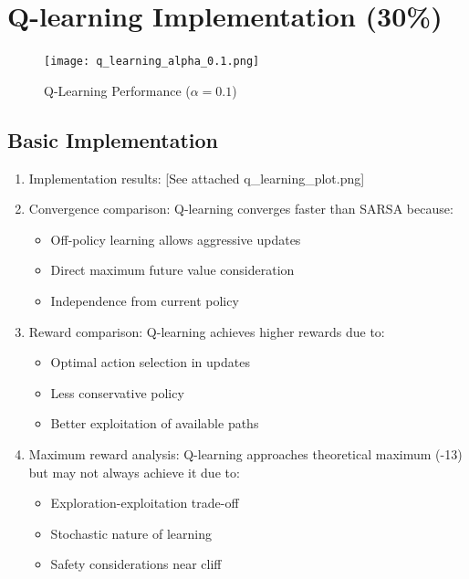 \documentclass{article}
\begin{document}
\section{Q-learning Implementation (30\%)}

\begin{figure}[h]
\centering
\texttt{[image: q\_learning\_alpha\_0.1.png]}
\caption{Q-Learning Performance ($\alpha=0.1$)}
\label{fig:qlearning_results}
\end{figure}

\subsection{Basic Implementation}
\begin{enumerate}[label=(\arabic*)]
\item Implementation results: [See attached q\_learning\_plot.png]

\item Convergence comparison:
Q-learning converges faster than SARSA because:
\begin{itemize}
    \item Off-policy learning allows aggressive updates
    \item Direct maximum future value consideration
    \item Independence from current policy
\end{itemize}

\item Reward comparison:
Q-learning achieves higher rewards due to:
\begin{itemize}
    \item Optimal action selection in updates
    \item Less conservative policy
    \item Better exploitation of available paths
\end{itemize}

\item Maximum reward analysis:
Q-learning approaches theoretical maximum (-13) but may not always achieve it due to:
\begin{itemize}
    \item Exploration-exploitation trade-off
    \item Stochastic nature of learning
    \item Safety considerations near cliff
\end{itemize}
\end{enumerate}
\end{document}
